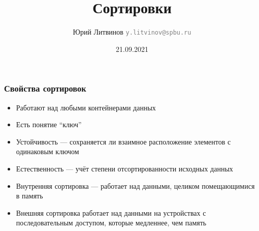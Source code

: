 \documentclass[xetex,mathserif,serif]{beamer}
\title{Сортировки}
\author[Юрий Литвинов]{Юрий Литвинов \newline \textcolor{gray}{\small\texttt{y.litvinov@spbu.ru}}}
\date{21.09.2021}
\begin{document}
	
	\frame{\titlepage}
	
	\begin{frame}
		\frametitle{Свойства сортировок}
		\begin{itemize}
			\item Работают над любыми контейнерами данных
			\item Есть понятие ``ключ''
			\item Устойчивость --- сохраняется ли взаимное расположение элементов с одинаковым ключом
			\item Естественность --- учёт степени отсортированности исходных данных
			\item Внутренняя сортировка --- работает над данными, целиком помещающимися в память
			\item Внешняя сортировка работает над данными на устройствах с последовательным доступом, которые медленнее, чем память
		\end{itemize}
	\end{frame}
\end{document}
